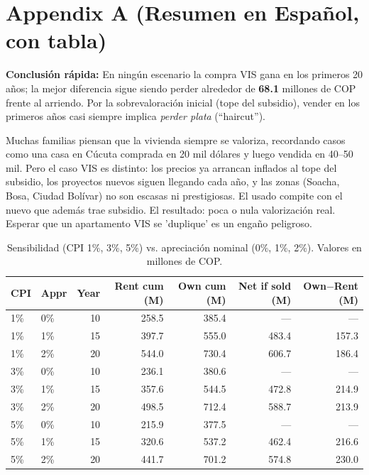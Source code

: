 \documentclass[12pt]{article}
\begin{document}
\section*{Appendix A (Resumen en Español, con tabla)}
\textbf{Conclusión rápida:} En ningún escenario la compra VIS gana en los primeros 20 años; la mejor diferencia sigue siendo perder alrededor de \textbf{68.1} millones de COP frente al arriendo. Por la sobrevaloración inicial (tope del subsidio), vender en los primeros años casi siempre implica \emph{perder plata} (``haircut''). 

Muchas familias piensan que la vivienda siempre se valoriza, recordando casos como una casa en Cúcuta comprada en 20 mil dólares y luego vendida en 40--50 mil. Pero el caso VIS es distinto: los precios ya arrancan inflados al tope del subsidio, los proyectos nuevos siguen llegando cada año, y las zonas (Soacha, Bosa, Ciudad Bolívar) no son escasas ni prestigiosas. El usado compite con el nuevo que además trae subsidio. El resultado: poca o nula valorización real. Esperar que un apartamento VIS se 'duplique' es un engaño peligroso.

\begin{table}[h]
\centering
\small
\begin{tabular}{llrrrrr}
\hline
CPI & Appr & Year & Rent cum (M) & Own cum (M) & Net if sold (M) & Own$-$Rent (M) \\
\hline
1\% & 0\% & 10 & 258.5 & 385.4 & --- & --- \\
1\% & 1\% & 15 & 397.7 & 555.0 & 483.4 & 157.3 \\
1\% & 2\% & 20 & 544.0 & 730.4 & 606.7 & 186.4 \\
3\% & 0\% & 10 & 236.1 & 380.6 & --- & --- \\
3\% & 1\% & 15 & 357.6 & 544.5 & 472.8 & 214.9 \\
3\% & 2\% & 20 & 498.5 & 712.4 & 588.7 & 213.9 \\
5\% & 0\% & 10 & 215.9 & 377.5 & --- & --- \\
5\% & 1\% & 15 & 320.6 & 537.2 & 462.4 & 216.6 \\
5\% & 2\% & 20 & 441.7 & 701.2 & 574.8 & 230.0 \\ \hline
\end{tabular}
\caption{Sensibilidad (CPI 1\%, 3\%, 5\%) vs. apreciaci\'on nominal (0\%, 1\%, 2\%). Valores en millones de COP.}
\label{tab:sensitivity}
\end{table}
\end{document}
